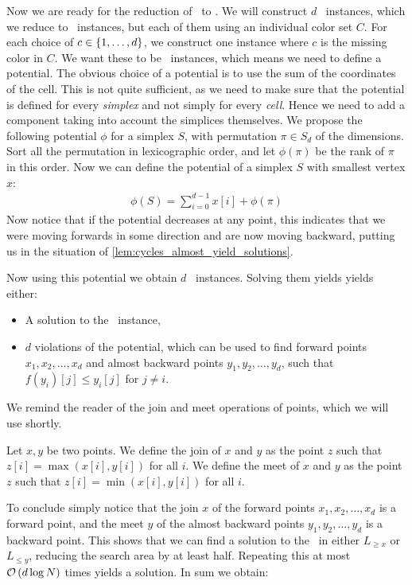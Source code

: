 Now we are ready for the reduction of \Tarskistar\ to \EndOfPotentialLine. We will construct $d$ \Tarskistar\ instances, which we reduce to \EndOfLine\ instances, but each of them using an individual color set $C$. For each choice of $c \in \left\{1, \dots, d\right\}$, we construct one instance where $c$ is the missing color in $C$. We want these to be \EndOfPotentialLine\ instances, which means we need to define a potential. The obvious choice of a potential is to use the sum of the coordinates of the cell. This is not quite sufficient, as we need to make sure that the potential is defined for every \emph{simplex} and not simply for every \emph{cell}. Hence we need to add a component taking into account the simplices themselves. We propose the following potential $\phi$ for a simplex $S$, with permutation $\pi \in S_d$ of the dimensions. Sort all the permutation in lexicographic order, and let $\phi(\pi)$ be the rank of $\pi$ in this order. Now we can define the potential of a simplex $S$ with smallest vertex $x$:
\begin{align*}
	\phi(S) = \sum_{i=0}^{d-1} x[i] + \phi(\pi)
\end{align*}
Now notice that if the potential decreases at any point, this indicates that we were moving forwards in some direction and are now moving backward, putting us in the situation of \cref{lem:cycles_almost_yield_solutions}.

Now using this potential we obtain $d$ \EndOfPotentialLine\ instances. Solving them yields yields either:
\begin{itemize}
	\item A solution to the \Tarskistar\ instance,
	\item $d$ violations of the potential, which can be used to find forward points $x_1, x_2, \dots, x_d$ and almost backward points $y_1, y_2, \dots, y_d$, such that $f(y_i)[j] \leq y_i[j]$ for $j \neq i$.
\end{itemize}

We remind the reader of the join and meet operations of points, which we will use shortly.
\begin{definition}
	Let $x, y$ be two points. We define the join of $x$ and $y$ as the point $z$ such that $z[i] = \max(x[i], y[i])$ for all $i$. We define the meet of $x$ and $y$ as the point $z$ such that $z[i] = \min(x[i], y[i])$ for all $i$.
\end{definition}
To conclude simply notice that the join $x$ of the forward points $x_1, x_2, \dots, x_d$ is a forward point, and the meet $y$ of the almost backward points $y_1, y_2, \dots, y_d$ is a backward point. This shows that we can find a solution to the \Tarskistar\ in either $L_{\geq x}$ or $L_{\leq y}$, reducing the search area by at least half. Repeating this at most $\mathcal{O}\left(d\log{N}\right)$ times yields a solution. In sum we obtain:

